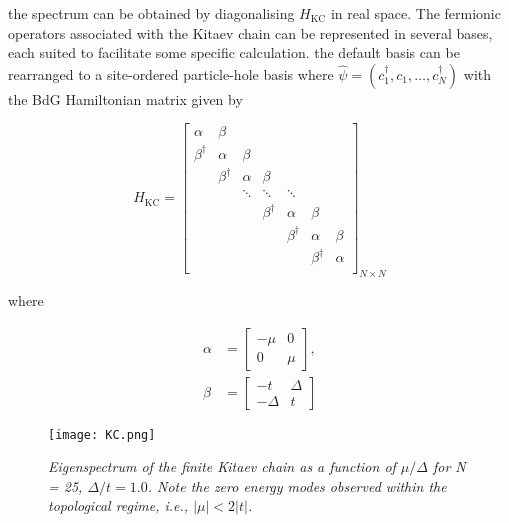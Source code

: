 the spectrum can be obtained by diagonalising $H_{\text{KC}}$ in real space. The fermionic operators associated with the Kitaev chain can be represented in several bases, each suited to facilitate some specific calculation. the default basis can be rearranged to a site-ordered particle-hole basis where $\hat{\psi} = (c_{1}^{\dagger},c_{1},\dots,c_{N}^{\dagger})$ with the BdG Hamiltonian matrix given by 

\begin{equation}
    H_{\text{KC}} = 
    \begin{bmatrix}
        \alpha & \beta &  &  &  &  &  \\
        \beta^{\dagger} & \alpha & \beta &  &  &  &  \\
        & \beta^{\dagger} & \alpha & \beta &  &  &  \\
        &  & \ddots & \ddots & \ddots &  &  \\
        &  &  & \beta^{\dagger} & \alpha & \beta &  \\
        &  &  &  & \beta^{\dagger} & \alpha & \beta \\
        &  &  &  &  & \beta^{\dagger} & \alpha \\        
    \end{bmatrix}_{N \times N}   
\end{equation}

where 

\begin{equation}
    \begin{aligned}
        \alpha &= 
        \begin{bmatrix}
            -\mu & 0 \\
            0 & \mu            
        \end{bmatrix}, \\
        \beta &= 
        \begin{bmatrix}
            -t & \Delta \\
            -\Delta & t             
        \end{bmatrix}        
    \end{aligned}    
\end{equation}

\clearpage

\vspace{1cm}

\begin{figure}[h]
\centering
\texttt{[image: KC.png]}
\caption{\textit{Eigenspectrum of the finite Kitaev chain as a function of $\mu/\Delta$ for N = 25, $\Delta/t = 1.0$. Note the zero energy modes observed within the topological regime, i.e., $|\mu| < 2|t|$.}}
\end{figure}

